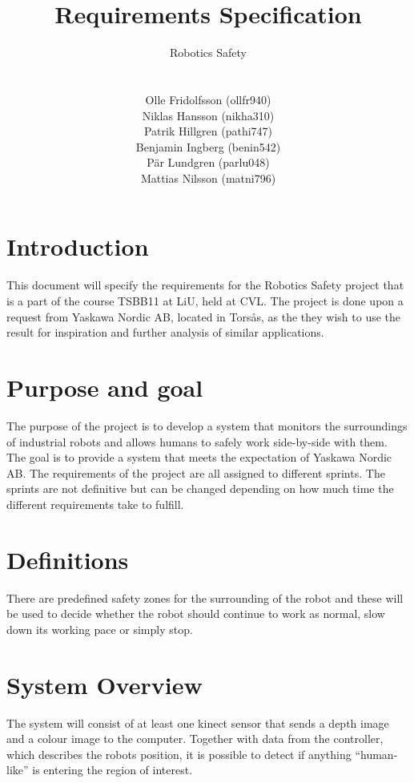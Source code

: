 \documentclass[10pt,a4paper]{article}
\title{Requirements Specification}
\author{\begin{large}{Robotics Safety}\end{large}\\\\
Olle Fridolfsson (ollfr940) \\  Niklas Hansson (nikha310) \\ Patrik Hillgren (pathi747) \\ Benjamin Ingberg (benin542)\\ Pär Lundgren (parlu048) \\ Mattias Nilsson (matni796)}
\begin{document}
\maketitle
\newpage
\tableofcontents
\newpage
\noindent %
\section{Introduction}
This document will specify the requirements for the Robotics Safety project that is a part of the course TSBB11 at LiU, held at CVL. The project is done upon a request from Yaskawa Nordic AB, located in Torsås, as the they wish to use the result for inspiration and further analysis of similar applications.
\section{Purpose and goal}
The purpose of the project is to develop a system that monitors the surroundings of industrial robots and allows humans to safely work side-by-side with them. 
The goal is to provide a system that meets the expectation of Yaskawa Nordic AB.
The requirements of the project are all assigned to different sprints. The sprints are not definitive but can be changed depending on how much time the different requirements take to fulfill. 

\section{Definitions}
There are predefined safety zones for the surrounding of the robot and these will be used to decide whether the robot should continue to work as normal, slow down its working pace or simply stop.

\section{System Overview}
The system will consist of at least one kinect sensor that sends a depth image and a colour image to the computer. Together with data from the controller, which describes the robots position, it is possible to detect if anything “human-like” is entering the region of interest.
\end{document}
